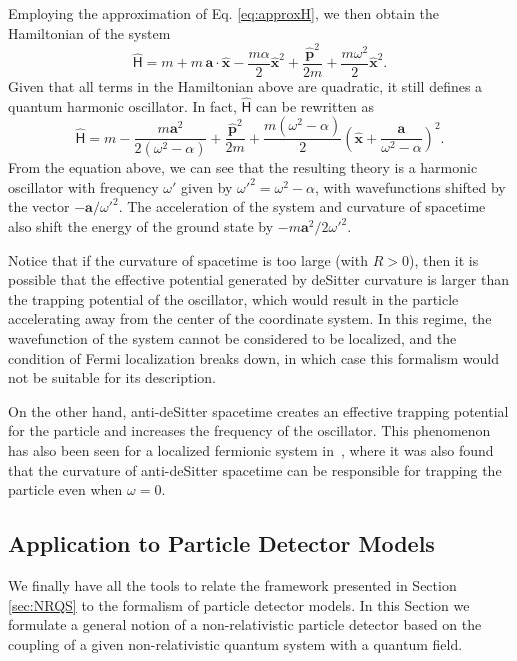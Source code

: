 \documentclass[letterpaper,12pt,titlepage,oneside,final]{book}
\begin{document}
Employing the approximation of Eq. \eqref{eq:approxH}, we then obtain the Hamiltonian of the system
\begin{equation}
    \hat{\mathsf{H}} = m + m\, \bm a \cdot \hat{\bm x} -\frac{m \alpha}{2} \hat{\bm x}^2 + \frac{\hat{\bm p}^2}{2m} + \frac{m\omega^2}{2}\hat{\bm x}^2.
\end{equation}
Given that all terms in the Hamiltonian above are quadratic, it still defines a quantum harmonic oscillator. In fact, $\hat{\mathsf{H}}$ can be rewritten as
\begin{equation}
    \hat{\mathsf{H}} = m -\frac{m \bm a^2}{2(\omega^2 - \alpha)}+ \frac{\hat{\bm p}^2}{2m} + \frac{m(\omega^2-\alpha)}{2}\left(\hat{\bm x}+\frac{\bm a}{\omega^2 - \alpha}\right)^2.
\end{equation}
From the equation above, we can see that the resulting theory is a harmonic oscillator with frequency $\omega'$ given by $\omega'^2 = \omega^2 -\alpha$, with wavefunctions shifted by the vector $- \bm a /\omega'^2$. The acceleration of the system and curvature of spacetime also shift the energy of the ground state by $-m\bm a^2/2\omega'^2$.

Notice that if the curvature of spacetime is too large (with $R>0$), then it is possible that the effective potential generated by deSitter curvature is larger than the trapping potential of the oscillator, which would result in the particle accelerating away from the center of the coordinate system. In this regime, the wavefunction of the system cannot be considered to be localized, and the condition of Fermi localization breaks down, in which case this formalism would not be suitable for its description. 

On the other hand, anti-deSitter spacetime creates an effective trapping potential for the particle and increases the frequency of the oscillator. This phenomenon has also been seen for a localized fermionic system in~\cite{jonas}, where it was also found that the curvature of anti-deSitter spacetime can be responsible for trapping the particle even when $\omega = 0$.

\subsection{Application to Particle Detector Models}\label{sec:detectors}

We finally have all the tools to relate the framework presented in Section \ref{sec:NRQS} to the formalism of particle detector models. In this Section we formulate a general notion of a non-relativistic particle detector based on the coupling of a given non-relativistic quantum system with a quantum field.
\end{document}
